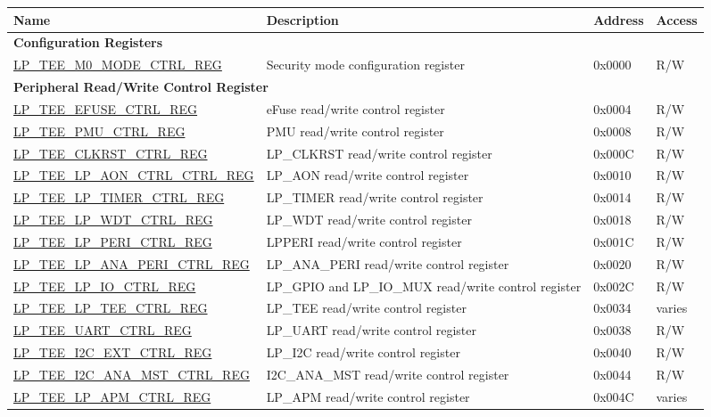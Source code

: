 \begin{longtable}{ | l | l | p{1.3cm} | p{1cm} | }
\hline\rowcolor{lightgray}
\textbf{Name} & \textbf{Description} &  \textbf{Address} & \textbf{Access} \\ \hline
\endhead
\multicolumn{4}{|l|}{\textbf{Configuration Registers}} \\ \hline
\hyperref[regdesc:LPTEEM0MODECTRLREG]{LP\_TEE\_M0\_MODE\_CTRL\_REG} & Security mode configuration register & 0x0000 & R/W \\ \hline
\multicolumn{4}{|l|}{\textbf{Peripheral Read/Write Control Register}} \\ \hline
\hyperref[regdesc:LPTEEEFUSECTRLREG]{LP\_TEE\_EFUSE\_CTRL\_REG} & eFuse read/write control register & 0x0004 & R/W \\ \hline
\hyperref[regdesc:LPTEEPMUCTRLREG]{LP\_TEE\_PMU\_CTRL\_REG} & PMU read/write control register & 0x0008 & R/W \\ \hline
\hyperref[regdesc:LPTEECLKRSTCTRLREG]{LP\_TEE\_CLKRST\_CTRL\_REG} & LP\_CLKRST read/write control register & 0x000C & R/W \\ \hline
\hyperref[regdesc:LPTEELPAONCTRLCTRLREG]{LP\_TEE\_LP\_AON\_CTRL\_CTRL\_REG} & LP\_AON read/write control register & 0x0010 & R/W \\ \hline
\hyperref[regdesc:LPTEELPTIMERCTRLREG]{LP\_TEE\_LP\_TIMER\_CTRL\_REG} & LP\_TIMER read/write control register & 0x0014 & R/W \\ \hline
\hyperref[regdesc:LPTEELPWDTCTRLREG]{LP\_TEE\_LP\_WDT\_CTRL\_REG} & LP\_WDT read/write control register & 0x0018 & R/W \\ \hline
\hyperref[regdesc:LPTEELPPERICTRLREG]{LP\_TEE\_LP\_PERI\_CTRL\_REG} & LPPERI read/write control register & 0x001C & R/W \\ \hline
\hyperref[regdesc:LPTEELPANAPERICTRLREG]{LP\_TEE\_LP\_ANA\_PERI\_CTRL\_REG} & LP\_ANA\_PERI read/write control register & 0x0020 & R/W \\ \hline
\hyperref[regdesc:LPTEELPIOCTRLREG]{LP\_TEE\_LP\_IO\_CTRL\_REG} & LP\_GPIO and LP\_IO\_MUX read/write control register & 0x002C & R/W \\ \hline
\hyperref[regdesc:LPTEELPTEECTRLREG]{LP\_TEE\_LP\_TEE\_CTRL\_REG} & LP\_TEE read/write control register & 0x0034 & varies \\ \hline
\hyperref[regdesc:LPTEEUARTCTRLREG]{LP\_TEE\_UART\_CTRL\_REG} & LP\_UART read/write control register & 0x0038 & R/W \\ \hline
\hyperref[regdesc:LPTEEI2CEXTCTRLREG]{LP\_TEE\_I2C\_EXT\_CTRL\_REG} & LP\_I2C read/write control register & 0x0040 & R/W \\ \hline
\hyperref[regdesc:LPTEEI2CANAMSTCTRLREG]{LP\_TEE\_I2C\_ANA\_MST\_CTRL\_REG} & I2C\_ANA\_MST read/write control register & 0x0044 & R/W \\ \hline
\hyperref[regdesc:LPTEELPAPMCTRLREG]{LP\_TEE\_LP\_APM\_CTRL\_REG} & LP\_APM read/write control register & 0x004C & varies \\ \hline


\end{longtable}
